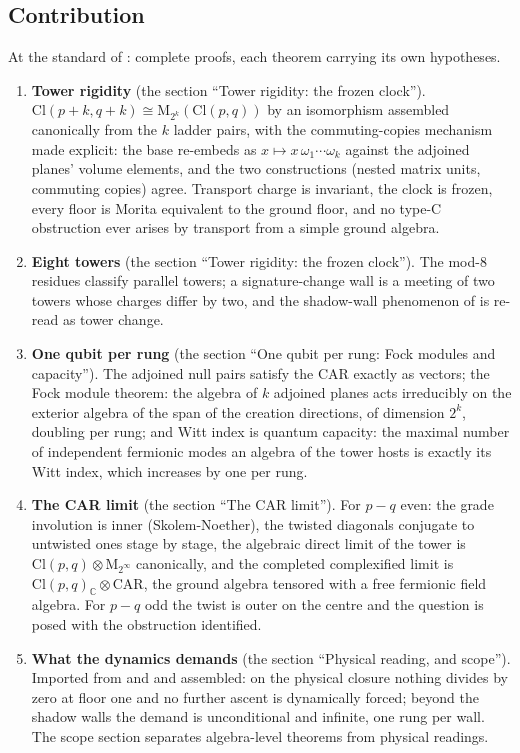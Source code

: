 \documentclass[11pt]{article}
\theoremstyle{definition}
\theoremstyle{plain}
\providecommand{\C}{}\renewcommand{\C}{\mathbb{C}}
\providecommand{\CAR}{}\renewcommand{\CAR}{\mathrm{CAR}}
\providecommand{\Cl}{}\renewcommand{\Cl}{\mathrm{Cl}}
\providecommand{\Mat}{}\renewcommand{\Mat}{\mathrm{M}}
\begin{document}
\subsection*{Contribution}
\label{c:note.tower.setting-contribution}
At the standard of \cite{ButlerT1}: complete proofs, each theorem carrying its own hypotheses.

\begin{enumerate}
\item \textbf{Tower rigidity} (the section ``Tower rigidity: the frozen clock''). $\Cl(p{+}k,q{+}k) \cong \Mat_{2^k}(\Cl(p,q))$ by an isomorphism assembled canonically from the $k$ ladder pairs, with the commuting-copies mechanism made explicit: the base re-embeds as $x \mapsto x\,\omega_1\cdots\omega_k$ against the adjoined planes' volume elements, and the two constructions (nested matrix units, commuting copies) agree. Transport charge is invariant, the clock is frozen, every floor is Morita equivalent to the ground floor, and no type-C obstruction ever arises by transport from a simple ground algebra.
\item \textbf{Eight towers} (the section ``Tower rigidity: the frozen clock''). The mod-8 residues classify parallel towers; a signature-change wall is a meeting of two towers whose charges differ by two, and the shadow-wall phenomenon of \cite{ButlerT4} is re-read as tower change.
\item \textbf{One qubit per rung} (the section ``One qubit per rung: Fock modules and capacity''). The adjoined null pairs satisfy the CAR exactly as vectors; the Fock module theorem: the algebra of $k$ adjoined planes acts irreducibly on the exterior algebra of the span of the creation directions, of dimension $2^k$, doubling per rung; and Witt index is quantum capacity: the maximal number of independent fermionic modes an algebra of the tower hosts is exactly its Witt index, which increases by one per rung.
\item \textbf{The CAR limit} (the section ``The CAR limit''). For $p - q$ even: the grade involution is inner (Skolem-Noether), the twisted diagonals conjugate to untwisted ones stage by stage, the algebraic direct limit of the tower is $\Cl(p,q) \otimes \Mat_{2^\infty}$ canonically, and the completed complexified limit is $\Cl(p,q)_\C \otimes \CAR$, the ground algebra tensored with a free fermionic field algebra. For $p - q$ odd the twist is outer on the centre and the question is posed with the obstruction identified.
\item \textbf{What the dynamics demands} (the section ``Physical reading, and scope''). Imported from \cite{ButlerT4} and \cite{ButlerT1} and assembled: on the physical closure nothing divides by zero at floor one and no further ascent is dynamically forced; beyond the shadow walls the demand is unconditional and infinite, one rung per wall. The scope section separates algebra-level theorems from physical readings.
\end{enumerate}
\end{document}

